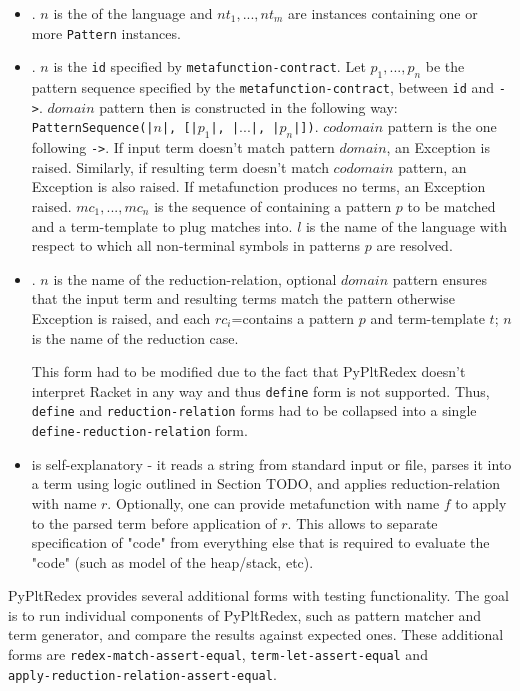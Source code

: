 \begin{itemize}
\item
\TlDefineLanguage. $n$ is the of the language and $nt_1,...,nt_m$ are \NtDefinitionN \space instances containing one or more \texttt{Pattern} instances.

\item
\TlDefineMetafunction. $n$ is the \texttt{id} specified by \texttt{metafunction-contract}. Let $p_1, ..., p_n$ be the pattern sequence specified by the \texttt{metafunction-contract}, between \texttt{id} and \texttt{->}. $domain$ pattern then is constructed in the following way: \texttt{PatternSequence(|$n$|, [|$p_1$|, |$...$|, |$p_n$|])}. $codomain$ pattern is the one following \texttt{->}. If input term doesn't match pattern $domain$, an Exception is raised. Similarly, if resulting term doesn't match $codomain$ pattern, an Exception is also raised. If metafunction produces no terms, an Exception raised. $mc_1,...,mc_n$ is the sequence of \MetafunctionCase containing a pattern $p$ to be matched and a term-template to plug matches into. $l$ is the name of the language with respect to which all non-terminal symbols in patterns $p$ are resolved.

\item \TlDefineReductionRelation. $n$ is the name of the reduction-relation, optional $domain$ pattern ensures that the input term and resulting terms match the pattern otherwise Exception is raised, and each $rc_i$=\ReductionCase contains a pattern $p$ and term-template $t$; $n$ is the name of the reduction case.

This form had to be modified due to the fact that PyPltRedex doesn't interpret Racket in any way and thus \texttt{define} form is not supported. Thus, \texttt{define} and \texttt{reduction-relation} forms had to be collapsed into a single \texttt{define-reduction-relation} form.

\item \ReadFromStdinAndApplyReductionRelation \space is self-explanatory -  it reads a string from standard input or file, parses it into a term using logic outlined in Section TODO, and applies reduction-relation with name $r$. Optionally, one can provide metafunction with name $f$ to apply to the parsed term before application of $r$. This allows to separate specification of "code" from everything else that is required to evaluate the "code" (such as model of the heap/stack, etc).
\end{itemize}

PyPltRedex provides several additional forms with testing functionality. The goal is to run individual components of PyPltRedex, such as pattern matcher and term generator, and compare the results against expected ones. These additional forms are \texttt{redex-match-assert-equal}, \texttt{term-let-assert-equal} and \\ \texttt{apply-reduction-relation-assert-equal}. 


